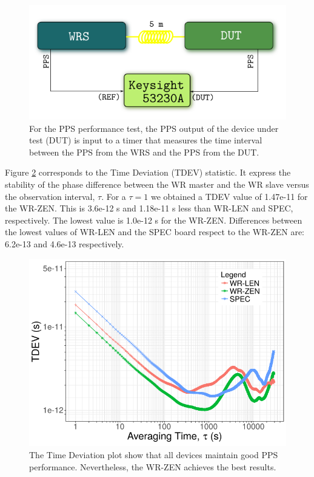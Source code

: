\begin{figure}[H]
	\centering
	\includegraphics[width=0.7\linewidth]{img/prueba1_pps}
	\caption[Connection diagram for the PPS performance test.]{For the PPS 
	performance test, the PPS output of the device under test (DUT) is input to 
	a timer that measures the time interval between the PPS from the WRS and 
	the PPS from the DUT.}
	\label{fig:prueba1pps}
\end{figure}

Figure \ref{fig:tdev_exp1} corresponds to the Time Deviation (TDEV) statistic. 
It express the stability of the phase difference between the WR master and the 
WR slave versus the observation interval, $\tau$. For a $\tau=1$ we obtained a 
TDEV value of 1.47e-11 for the WR-ZEN. This is 3.6e-12 s and 1.18e-11 s less than WR-LEN and SPEC, respectively. The lowest value is 1.0e-12 s for the WR-ZEN. Differences between the lowest values of WR-LEN and the SPEC board respect to the WR-ZEN are: 6.2e-13 and 4.6e-13 respectively.

\begin{figure}
    \centering
    \includegraphics[width=0.7\linewidth]{img/tdev_exp1}
    \caption[TDEV for the WR devices comparison.]{The Time Deviation plot show 
        that all devices maintain good PPS performance. Nevertheless, the 
        WR-ZEN 
        achieves the best results.}
    \label{fig:tdev_exp1}
\end{figure}

